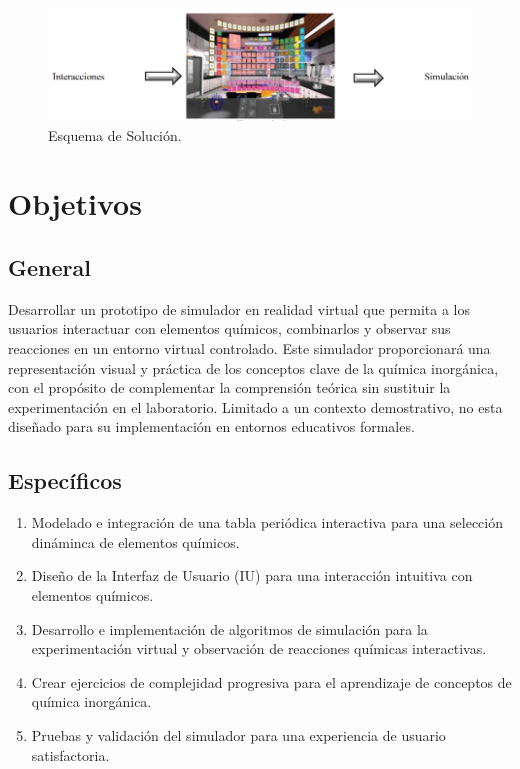 \begin{figure}[thbp]
    \centering
    \includegraphics[width=\textwidth]{img/chapter01/Sistema.png}
    \caption{Esquema de Solución.}\label{fig:Esquema}
\end{figure}
\newpage
\section{Objetivos}

\subsection{General}
Desarrollar un prototipo de simulador en realidad virtual que permita a los usuarios interactuar con elementos químicos, combinarlos y observar sus reacciones en un entorno virtual controlado. Este simulador proporcionará una representación visual y práctica de los conceptos clave de la química inorgánica, con el propósito de complementar la comprensión teórica sin sustituir la experimentación en el laboratorio. Limitado a un contexto demostrativo, no esta diseñado para su implementación en entornos educativos formales.


\subsection{Específicos}
\begin{enumerate}[i]
  \item Modelado e integración de una tabla periódica interactiva para una selección dináminca de elementos químicos.
  \item Diseño de la Interfaz de Usuario (IU) para una interacción intuitiva con elementos químicos.
  \item Desarrollo e implementación de algoritmos de simulación para la experimentación virtual y observación de reacciones químicas interactivas.
  \item Crear ejercicios de complejidad progresiva para el aprendizaje de conceptos de química inorgánica.
  \item Pruebas y validación del simulador para una experiencia de usuario satisfactoria.
\end{enumerate}

